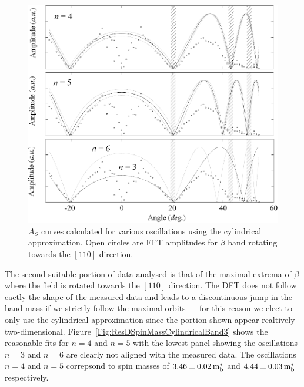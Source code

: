 \begin{figure}[htbp]
    \begin{center}
        \includegraphics[scale=0.75]{Chapter-dHvABaFe2P2/Figures/Mass/SpinMassBand3Cylindrical/SpinMassBand3Cylindrical_110}
        \caption{$A_S$ curves calculated for various oscillations using the cylindrical approximation. Open circles are \ac{FFT} amplitudes for $\beta$ band rotating towards the $[110]$ direction.}
        \label{Fig:ResD:SpinMassFromDFTBand4}
    \end{center}
\end{figure}
The second suitable portion of data analysed is that of the maximal extrema of $\beta$ where the field is rotated towards the $[110]$ direction. The \ac{DFT} does not follow eactly the shape of the measured data and leads to a discontinuous jump in the band mass if we strictly follow the maximal orbits --- for this reason we elect to only use the cylindrical approximation since the portion shown appear realtively two-dimensional. Figure~\ref{Fig:ResDSpinMassCylindricalBand3} shows the reasonable fits for $n=4$ and $n=5$ with the lowest panel showing the oscillations $n=3$ and $n=6$ are clearly not aligned with the measured data. The oscillations $n=4$ and $n=5$ correpsond to spin masses of $\unit[3.46\pm0.02]{m^*_b}$ and $\unit[4.44\pm0.03]{m^*_b}$ respectively.

